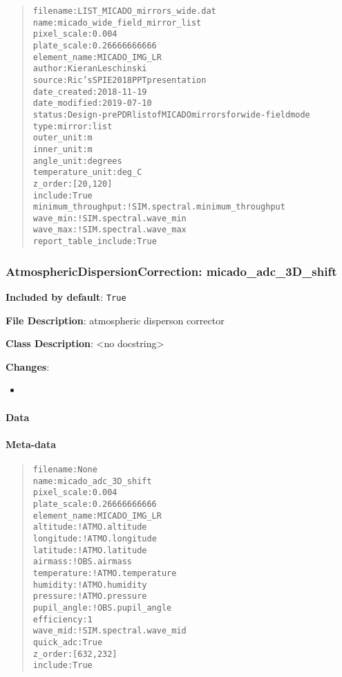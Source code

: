 \documentclass[a4paper]{article}
\begin{document}
\begin{quote}
\begin{alltt}
            filename : LIST_MICADO_mirrors_wide.dat
                name : micado_wide_field_mirror_list
         pixel_scale : 0.004
         plate_scale : 0.26666666666
        element_name : MICADO_IMG_LR
              author : Kieran Leschinski
              source : Ric's SPIE 2018 PPT presentation
        date_created : 2018-11-19
       date_modified : 2019-07-10
              status : Design - pre PDR list of MICADO mirrors for wide-field mode
                type : mirror:list
          outer_unit : m
          inner_unit : m
          angle_unit : degrees
    temperature_unit : deg_C
             z_order : [20, 120]
             include : True
  minimum_throughput : !SIM.spectral.minimum_throughput
            wave_min : !SIM.spectral.wave_min
            wave_max : !SIM.spectral.wave_max
report_table_include : True
\end{alltt}
\end{quote}


\subsubsection{AtmosphericDispersionCorrection: \textquotedbl{}micado\_adc\_3D\_shift\textquotedbl{}%
  \label{atmosphericdispersioncorrection-micado-adc-3d-shift}%
}

\textbf{Included by default}: \texttt{True}

\textbf{File Description}: atmospheric disperson corrector

\textbf{Class Description}: <no docstring>

\textbf{Changes}:

\begin{itemize}
\item \end{itemize}


\paragraph{Data%
  \label{id49}%
}


\paragraph{Meta-data%
  \label{id50}%
}

\begin{quote}
\begin{alltt}
    filename : None
        name : micado_adc_3D_shift
 pixel_scale : 0.004
 plate_scale : 0.26666666666
element_name : MICADO_IMG_LR
    altitude : !ATMO.altitude
   longitude : !ATMO.longitude
    latitude : !ATMO.latitude
     airmass : !OBS.airmass
 temperature : !ATMO.temperature
    humidity : !ATMO.humidity
    pressure : !ATMO.pressure
 pupil_angle : !OBS.pupil_angle
  efficiency : 1
    wave_mid : !SIM.spectral.wave_mid
   quick_adc : True
     z_order : [632, 232]
     include : True
\end{alltt}
\end{quote}
\end{document}
